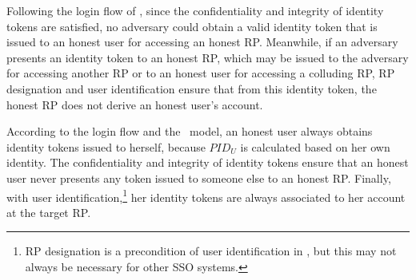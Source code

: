 
Following the login flow of \usso, since the confidentiality and integrity of identity tokens are satisfied, no adversary could obtain a valid identity token that is issued to an honest user for accessing an honest RP. %
Meanwhile, if an adversary presents an identity token to an honest RP, which may be issued to the adversary for accessing another RP or to an honest user for accessing a colluding RP, RP designation and user identification ensure that from this identity token, the honest RP does not derive an honest user's account.

According to the login flow and the \dyu\ model, an honest user always obtains identity tokens issued to herself, because $PID_U$ is calculated based on her own identity.
The confidentiality and integrity of identity tokens ensure that an honest user never presents any token issued to someone else to an honest RP. Finally, with user identification,\footnote{RP designation is a precondition of user identification in \usso, but this may not always be necessary for other SSO systems.} her identity tokens are always associated to her account at the target RP.

